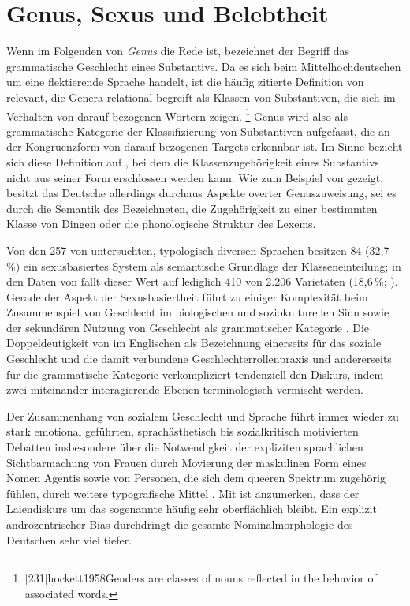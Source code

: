 \section{Genus, Sexus und Belebtheit}
\label{sec:gendsex}

Wenn im Folgenden von \textit{Genus} die Rede ist, bezeichnet der Begriff das
grammatische Geschlecht eines Substantivs. Da es sich beim
Mittelhochdeutschen um eine flektierende Sprache handelt,
ist die häufig zitierte Definition von \citet[231]{hockett1958} relevant, die
Genera relational begreift als Klassen von Substantiven, die sich im Verhalten
von darauf bezogenen Wörtern zeigen.%
%
	\footnote{[231]{hockett1958}{Genders are classes
		of nouns reflected in the behavior of associated words}.}
%
Genus wird also als grammatische Kategorie der Klassifizierung von Substantiven
aufgefasst, die an der Kongruenzform von darauf bezogenen Targets erkennbar
ist. Im Sinne  bezieht sich diese Definition auf
, bei dem die Klassenzugehörigkeit eines Substantivs nicht
aus seiner Form erschlossen werden kann. Wie zum Beispiel von
\citet{koepckezubin2017} gezeigt, besitzt das Deutsche
allerdings durchaus Aspekte overter Genuszuweisung, sei es durch die Semantik
des Bezeichneten, die Zugehörigkeit zu einer bestimmten Klasse von Dingen oder
die phonologische Struktur des Lexems.

Von den 257 von \citet{corbett2013b} untersuchten, typologisch diversen
Sprachen besitzen 84 (32,7\,\%) ein sexusbasiertes System als semantische
Grundlage der Klasseneinteilung; in den Daten von 
\autocite{skirgardetal2023} fällt dieser Wert auf lediglich 410 von 2.206
Varietäten (18,6\,\%; \cite[siehe][]{haynie:gb051}). Gerade der Aspekt der
Sexusbasiertheit führt zu einiger Komplexität beim Zusammenspiel von Geschlecht
im biologischen und soziokulturellen Sinn sowie der sekundären Nutzung von
Geschlecht als grammatischer Kategorie \autocites[dazu
ausführlich][]{kotthoffnuebling2018}{steriopolosteriopolo2022}. Die
Doppeldeutigkeit von  im Englischen als Bezeichnung
einerseits für das soziale Geschlecht und die damit verbundene
Geschlechter\-rollen\-praxis und andererseits für die grammatische Kategorie
verkompliziert tendenziell den Diskurs, indem zwei miteinander interagierende
Ebenen terminologisch vermischt werden.

Der Zusammenhang von sozialem Geschlecht und Sprache führt immer wieder zu
stark emotional geführten, sprachästhetisch bis sozialkritisch motivierten
Debatten insbesondere über die Notwendigkeit der expliziten sprachlichen
Sichtbarmachung von Frauen durch Movierung der maskulinen Form eines Nomen
Agentis sowie von Personen, die sich dem queeren Spektrum zugehörig fühlen,
durch weitere typografische Mittel \autocite[dazu kritisch
resümierend][]{kasper2022}. Mit \citet[61--89]{kotthoffnuebling2018} ist
anzumerken, dass der Laiendiskurs um das sogenannte  häufig sehr
oberflächlich bleibt. Ein explizit andro\-zentrischer Bias durchdringt die
gesamte Nominalmorphologie des Deutschen sehr viel tiefer.

